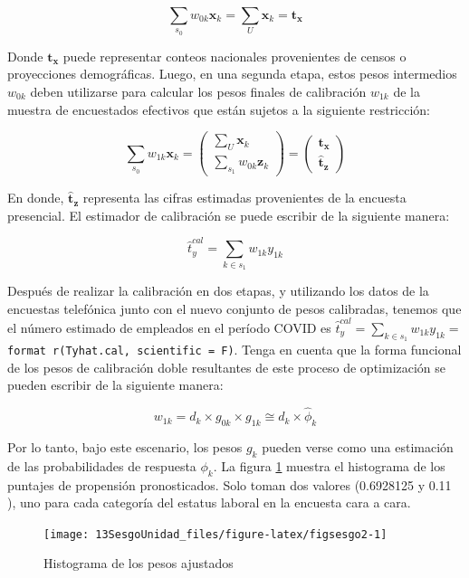 \documentclass[
  12pt,
]{book}
\begin{document}
\[
\sum_{s_0}w_{0k}\boldsymbol{x}_{k} = \sum_{U}\boldsymbol{x}_{k} = \mathbf{t_x}
\]

Donde \(\mathbf{t_x}\) puede representar conteos nacionales provenientes de censos o proyecciones demográficas. Luego, en una segunda etapa, estos pesos intermedios \(w_{0k}\) deben utilizarse para calcular los pesos finales de calibración \(w_{1k}\) de la muestra de encuestados efectivos que están sujetos a la siguiente restricción:

\[
\sum_{s_0}w_{1k}\boldsymbol{x}_{k} =
\begin{pmatrix}
\sum_{U}\boldsymbol{x}_{k}\\
\sum_{s_1}w_{0k}\boldsymbol{z}_{k} 
\end{pmatrix} =
\begin{pmatrix}
\mathbf{t_x}\\
\hat{\mathbf{t}}_\mathbf{z}
\end{pmatrix}
\]

En donde, \(\hat{\mathbf{t}}_\mathbf{z}\) representa las cifras estimadas provenientes de la encuesta presencial. El estimador de calibración se puede escribir de la siguiente manera:

\[
\hat{t}_y^{cal}=\sum_{k\in s_1}w_{1k}y_{1k}
\]

Después de realizar la calibración en dos etapas, y utilizando los datos de la encuestas telefónica junto con el nuevo conjunto de pesos calibradas, tenemos que el número estimado de empleados en el período COVID es \(\hat{t}_y^{cal}=\sum_{k\in s_1}w_{1k}y_{1k}=\) \texttt{format\ r(Tyhat.cal,\ scientific\ =\ F)}. Tenga en cuenta que la forma funcional de los pesos de calibración doble resultantes de este proceso de optimización se pueden escribir de la siguiente manera:

\[
w_{1k} = d_k \times g_{0k} \times g_{1k} \cong d_k \times \hat \phi_k
\]

Por lo tanto, bajo este escenario, los pesos \(g_k\) pueden verse como una estimación de las probabilidades de respuesta \(\phi_k\). La figura \ref{fig:figsesgo2} muestra el histograma de los puntajes de propensión pronosticados. Solo toman dos valores (0.6928125 y 0.11 ), uno para cada categoría del estatus laboral en la encuesta cara a cara.

\begin{figure}

{\centering \texttt{[image: 13SesgoUnidad\_files/figure-latex/figsesgo2-1]} 

}

\caption{Histograma de los pesos ajustados}\label{fig:figsesgo2}
\end{figure}
\end{document}
